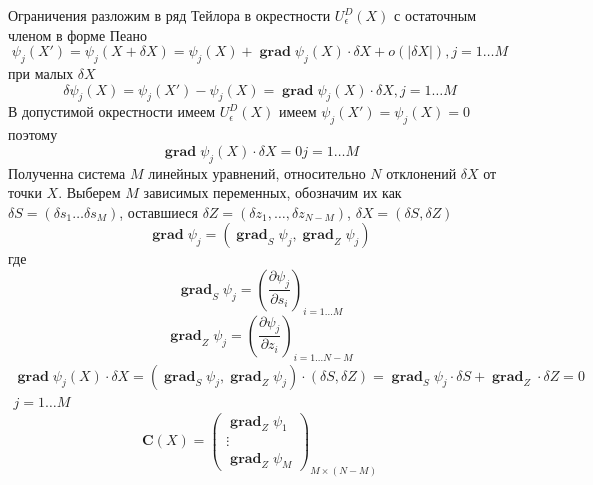 \documentclass[14pt]{extarticle}
\DeclareMathOperator{\grad}{\textbf{grad}}
\begin{document}
    Ограничения разложим в ряд Тейлора в окрестности 
    $U_{\epsilon}^{D}(X)$ 
    с остаточным членом в форме Пеано
    \begin{equation}
    \psi_{j}(X') =
    \psi_{j}(X + \delta X) = 
    \psi_{j}(X) + \grad \psi_{j}(X) \cdot \delta X  +
    o(|\delta X|) ,j = 1 \dots M
    \end{equation} 
    при малых $\delta X$
     \begin{equation}
    \delta \psi_{j}(X) = \psi_{j}(X') -\psi_{j}(X) =
    \grad{\psi_{j}(X)} \cdot \delta X, j = 1 \dots M
    \end{equation} 
    В допустимой окрестности 
    имеем $U_{\epsilon}^{D}(X)$ 
    имеем $\psi_{j}(X') = \psi_{j}(X) = 0$ 
    поэтому 
    \begin{equation}
    \grad \psi_{j}(X)  \cdot \delta X = 0 j=1 \dots M
    \end{equation} 
    Полученна система $M$ линейных уравнений,
    относительно  $N$ отклонений  $\delta X$ 
    от точки $X$.
    Выберем  $M$ зависимых переменных, обозначим их как
     $\delta S = (\delta s_1 \dots \delta s_{M})$, оставшиеся  $\delta Z = (\delta z_1,\dots, \delta z_{N  - M})$, $\delta X = (\delta S, \delta Z)$
      \begin{equation}
     \grad \psi_{j} = (\grad_{S} \psi_{j},\grad_{Z} \psi_{j})
     \end{equation} 
     где
     \begin{equation}
	     \grad_{S} \psi_{j} = \left(\frac{\partial \psi_{j}}{\partial s_{i}}\right)_{i = 1 \dots M}
     \end{equation} 
     \begin{equation}
     \grad_{Z} \psi_{j} = \left(\frac{\partial \psi_{j}}{\partial z_{i}}\right)_{i = 1 \dots N - M}
     \end{equation} 
     \begin{equation}
	     \begin{split}
     \grad \psi_{j}(X) \cdot \delta X = 
     (\grad_{S} \psi_{j}, \grad_{Z} \psi_{j}) \cdot (\delta S,\delta Z) = \grad_{S} \psi_{j} \cdot \delta S + \grad_{Z} \cdot \delta Z = 0 \\ j = 1 \dots M
	     \end{split}
     \end{equation} 
     \begin{equation}
     \mathbf{C}(X) = 
     \begin{pmatrix} 
     \grad_{Z}  \psi_{1}\\
     \vdots\\
     \grad_{Z} \psi_{M}
     \end{pmatrix}_{M \times (N - M)}
     \end{equation} 
\end{document}
